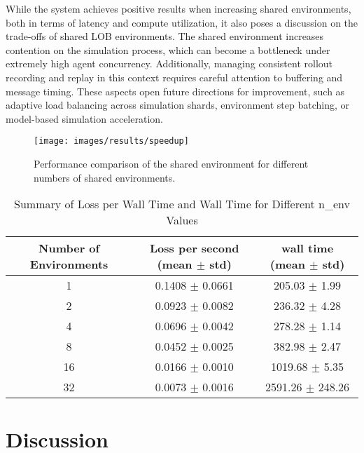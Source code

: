 
While the system achieves positive results when increasing shared environments, both in terms of latency and compute utilization,
it also poses a discussion on the trade-offs of shared LOB environments.
The shared environment increases contention on the simulation process, which can become a bottleneck under extremely high agent concurrency.
Additionally, managing consistent rollout recording and replay in this context requires careful attention to buffering and message timing.
These aspects open future directions for improvement, such as adaptive load balancing across simulation shards, environment step batching,
or model-based simulation acceleration.

\begin{figure}
    \centering
    \texttt{[image: images/results/speedup]}
    \caption{Performance comparison of the shared environment for different numbers of shared environments.}
    \label{fig:speedup}
\end{figure}

\begin{table}[ht]
    \centering
    \begin{tabular}{|c|c|c|}
        \hline
        \textbf{Number of Environments} & \textbf{Loss per second (mean $\pm$ std)} & \textbf{wall time (mean $\pm$ std)} \\ \hline
        1  & 0.1408 $\pm$ 0.0661 & 205.03 $\pm$ 1.99 \\ \hline
        2  & 0.0923 $\pm$ 0.0082 & 236.32 $\pm$ 4.28 \\ \hline
        4  & 0.0696 $\pm$ 0.0042 & 278.28 $\pm$ 1.14 \\ \hline
        8  & 0.0452 $\pm$ 0.0025 & 382.98 $\pm$ 2.47 \\ \hline
        16 & 0.0166 $\pm$ 0.0010 & 1019.68 $\pm$ 5.35 \\ \hline
        32 & 0.0073 $\pm$ 0.0016 & 2591.26 $\pm$ 248.26 \\ \hline
    \end{tabular}
    \caption{Summary of Loss per Wall Time and Wall Time for Different n\_env Values}
    \label{tab:summary}
\end{table}


\section{Discussion}
\label{sec:discussion}

